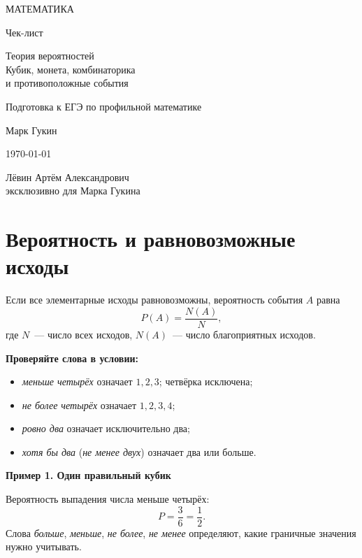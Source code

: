 \documentclass[a4paper,12pt]{article}
\newcommand{\keyidea}[1]{\textcolor{darkaccent}{\bfseries #1}}
\newcommand{\ex}[1]{\par\smallskip\textcolor{accent}{\bfseries #1}\par\smallskip}
\begin{document}
\begin{titlepage}
\thispagestyle{empty}
\centering
\vspace*{26mm}
{\normalsize\color{darkaccent}\MakeUppercase{Математика}\par}
\vspace{18mm}
{\LARGE Чек-лист\par}
\vspace{16mm}
{\LARGE\color{accent} Теория вероятностей\\[3mm]
\large Кубик, монета, комбинаторика\\ и противоположные события\par}
\vspace{19mm}
{\normalsize Подготовка к ЕГЭ по профильной математике\par}
\vfill
{\large Марк Гукин\par}
\vspace{12mm}
{\normalsize \today\par}
\vspace{20mm}
{\small Лёвин Артём Александрович\\[2mm]
эксклюзивно для Марка Гукина\par}
\vspace{21mm}
\vspace{3mm}
\end{titlepage}

\section{Вероятность и равновозможные исходы}
Если все элементарные исходы равновозможны, вероятность события $A$ равна
\[
\boxed{\displaystyle P(A)=\frac{N(A)}{N}},
\]
где $N$~--- число всех исходов, $N(A)$~--- число благоприятных исходов.

\keyidea{Проверяйте слова в условии:}
\begin{itemize}
\item \emph{меньше четырёх} означает $1,2,3$; четвёрка исключена;
\item \emph{не более четырёх} означает $1,2,3,4$;
\item \emph{ровно два} означает исключительно два;
\item \emph{хотя бы два} (\emph{не менее двух}) означает два или больше.
\end{itemize}
\ex{Пример 1. Один правильный кубик}
Вероятность выпадения числа меньше четырёх:
\[
P=\frac{3}{6}=\frac12.
\]
\textcolor{softgray}{Слова \emph{больше}, \emph{меньше}, \emph{не более}, \emph{не менее} определяют, какие граничные значения нужно учитывать.}
\end{document}
